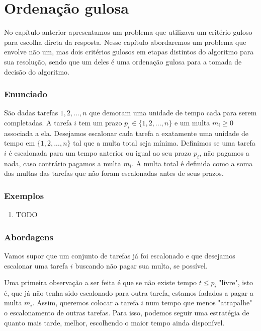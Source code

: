 \chapter{Ordenação gulosa}
\label{ordenacao}

No capítulo anterior apresentamos um problema que utilizava um critério guloso para escolha direta da resposta. Nesse capítulo abordaremos um problema que envolve não um, mas dois critérios gulosos em etapas distintos do algoritmo para sua resolução, sendo que um deles é uma ordenação gulosa para a tomada de decisão do algoritmo.

\subsection*{Enunciado}

São dadas tarefas $1, 2, ..., n$ que demoram uma unidade de tempo cada para serem completadas. A tarefa $i$ tem um prazo $p_i \in \{1, 2, ..., n\}$ e um multa $m_i \geq 0$ associada a ela. Desejamos escalonar cada tarefa a exatamente uma unidade de tempo em $\{1, 2, ..., n\}$ tal que a multa total seja mínima. Definimos se uma tarefa $i$ é escalonada para um tempo anterior ou igual ao seu prazo $p_i$, não pagamos a nada, caso contrário pagamos a multa $m_i$. A multa total é definida como a soma das multas das tarefas que não foram escalonadas antes de seus prazos.

\subsection*{Exemplos}

\begin{enumerate}
    \item TODO
\end{enumerate}

\subsection*{Abordagens}

Vamos supor que um conjunto de tarefas já foi escalonado e que desejamos escalonar uma tarefa $i$ buscando não pagar sua multa, se possível.

Uma primeira observação a ser feita é que se não existe tempo $t \leq p_i$ "livre", isto é, que já não tenha sido escalonado para outra tarefa, estamos fadados a pagar a multa $m_i$. Assim, queremos colocar a tarefa $i$ num tempo que menos "atrapalhe" o escalonamento de outras tarefas. Para isso, podemos seguir uma estratégia de quanto mais tarde, melhor, escolhendo o maior tempo ainda disponível.

